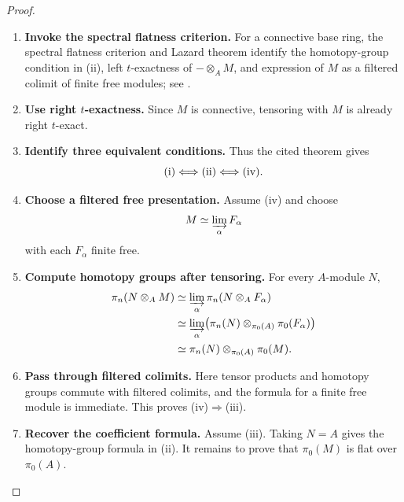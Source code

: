 \begin{proof}
\leavevmode
\begin{enumerate}[label=\textup{(\arabic*)}]
    \item \textbf{Invoke the spectral flatness criterion.}
    For a connective base ring, the spectral flatness criterion and Lazard
    theorem identify the homotopy-group condition in \textup{(ii)}, left
    \(t\)-exactness of \(-\otimes_A M\), and expression of \(M\) as a
    filtered colimit of finite free modules; see
    \cite[Definition~7.2.2.10 and Theorem~7.2.2.15]{LurieHigherAlgebra}.

    \item \textbf{Use right $t$-exactness.}
    Since \(M\) is connective, tensoring with \(M\) is already right
    \(t\)-exact.

    \item \textbf{Identify three equivalent conditions.}
    Thus the cited theorem gives
    \[
        \textup{(i)}\Longleftrightarrow\textup{(ii)}
        \Longleftrightarrow\textup{(iv)}.
    \]

    \item \textbf{Choose a filtered free presentation.}
    Assume \textup{(iv)} and choose
    \[
        M\simeq\varinjlim_\alpha F_\alpha
    \]
    with each \(F_\alpha\) finite free.

    \item \textbf{Compute homotopy groups after tensoring.}
    For every \(A\)-module \(N\),
    \[
    \begin{aligned}
        \pi_n(N\otimes_A M)
        &\simeq
        \varinjlim_\alpha\pi_n(N\otimes_A F_\alpha)
        \\
        &\simeq
        \varinjlim_\alpha
        \bigl(\pi_n(N)\otimes_{\pi_0(A)}\pi_0(F_\alpha)\bigr)
        \\
        &\simeq
        \pi_n(N)\otimes_{\pi_0(A)}\pi_0(M).
    \end{aligned}
    \]

    \item \textbf{Pass through filtered colimits.}
    Here tensor products and homotopy groups commute with filtered colimits,
    and the formula for a finite free module is immediate. This proves
    \textup{(iv)}\(\Rightarrow\)\textup{(iii)}.

    \item \textbf{Recover the coefficient formula.}
    Assume \textup{(iii)}. Taking \(N=A\) gives the homotopy-group formula
    in \textup{(ii)}. It remains to prove that \(\pi_0(M)\) is flat over
    \(\pi_0(A)\).


\end{enumerate}
\end{proof}
